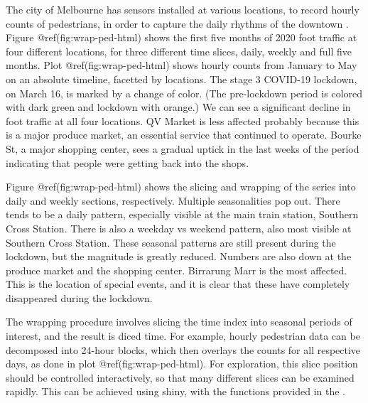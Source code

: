 The city of Melbourne has sensors installed at various locations, to
record hourly counts of pedestrians, in order to capture the daily
rhythms of the downtown \citep{ped}. Figure @ref(fig:wrap-ped-html)
shows the first five months of 2020 foot traffic at four different
locations, for three different time slices, daily, weekly and full five
months. Plot @ref(fig:wrap-ped-html) shows hourly counts from January to
May on an absolute timeline, facetted by locations. The stage 3 COVID-19
lockdown, on March 16, is marked by a change of color. (The pre-lockdown
period is colored with dark green and lockdown with orange.) We can see
a significant decline in foot traffic at all four locations. QV Market
is less affected probably because this is a major produce market, an
essential service that continued to operate. Bourke St, a major shopping
center, sees a gradual uptick in the last weeks of the period indicating
that people were getting back into the shops.

Figure @ref(fig:wrap-ped-html) shows the slicing and wrapping of the
series into daily and weekly sections, respectively. Multiple
seasonalities pop out. There tends to be a daily pattern, especially
visible at the main train station, Southern Cross Station. There is also
a weekday vs weekend pattern, also most visible at Southern Cross
Station. These seasonal patterns are still present during the lockdown,
but the magnitude is greatly reduced. Numbers are also down at the
produce market and the shopping center. Birrarung Marr is the most
affected. This is the location of special events, and it is clear that
these have completely disappeared during the lockdown.

The wrapping procedure involves slicing the time index into seasonal
periods of interest, and the result is diced time. For example, hourly
pedestrian data can be decomposed into 24-hour blocks, which then
overlays the counts for all respective days, as done in plot
@ref(fig:wrap-ped-html). For exploration, this slice position should be
controlled interactively, so that many different slices can be examined
rapidly. This can be achieved using shiny, with the functions provided
in the .

